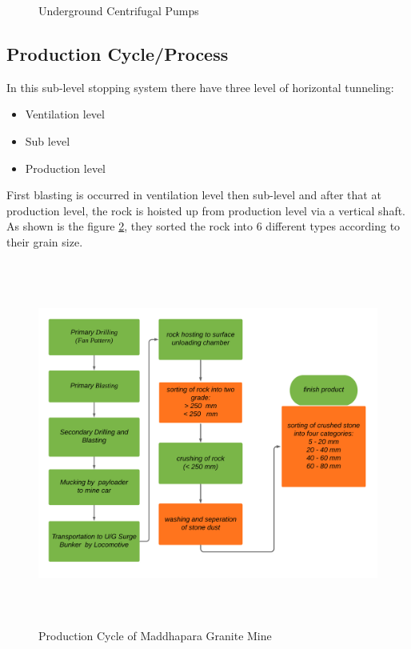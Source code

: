 \documentclass[12pt,a4paper]{article}
\begin{document}
\begin{figure}[ht]
\centering
{}
\caption{Underground Centrifugal Pumps}
\label{pump}
\end{figure}


\subsection{Production Cycle/Process}
In this sub-level stopping system there have three level of horizontal tunneling:
\begin{itemize}
\item Ventilation level
\item Sub level
\item Production level
\end{itemize}
First blasting is occurred in ventilation level then sub-level and after that at production level, the rock is hoisted up from production level via a vertical shaft. As shown is the figure \ref{flowchart}, they sorted the rock into 6 different types according to their grain size.
\begin{figure}[ht]
\centering
\includegraphics[width=\linewidth, height= 12cm]{flowchart.png}
\caption{Production Cycle of Maddhapara Granite Mine}
\label{flowchart}
\end{figure}
\clearpage
\end{document}
